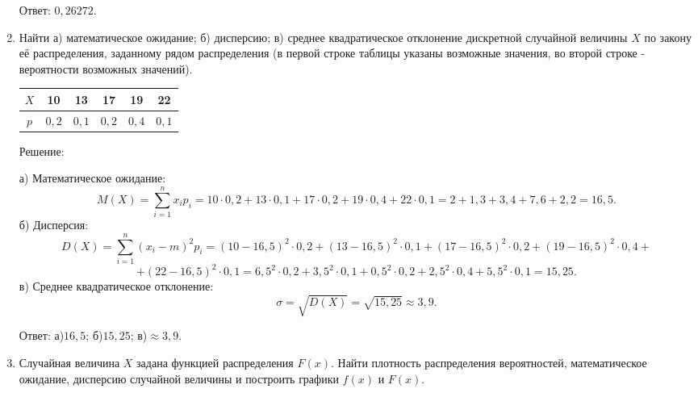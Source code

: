 \documentclass{article}
\begin{document}
\begin{enumerate}
Ответ: $0,26272$.

\item %
Найти а) математическое ожидание; б) дисперсию; в) среднее квадратическое отклонение дискретной случайной величины $X$ по закону её распределения, заданному рядом распределения (в первой строке таблицы указаны возможные значения, во второй строке - вероятности возможных значений).

\begin{center}
\begin{tabular}{|c|c|c|c|c|c|}
\hline
$X$ & 10 & 13 & 17 & 19 & 22 \\
\hline
$p$ & $0,2$ & $0,1$ & $0,2$ & $0,4$ & $0,1$ \\
\hline
\end{tabular}
\end{center}
\begin{center}Решение:\end{center}
а) Математическое ожидание: $$M(X)=\sum_{i=1}^n x_i p_i=10\cdot0,2+13\cdot0,1+17\cdot0,2+19\cdot0,4+22\cdot0,1=2+1,3+3,4+7,6+2,2=16,5.$$
б) Дисперсия:
$$D(X)=\sum_{i=1}^n (x_i-m)^2 p_i=(10-16,5)^2\cdot0,2+(13-16,5)^2\cdot0,1+(17-16,5)^2\cdot0,2+(19-16,5)^2\cdot0,4+$$
$$+(22-16,5)^2\cdot0,1=6,5^2\cdot0,2+3,5^2\cdot0,1+0,5^2\cdot0,2+2,5^2\cdot0,4+5,5^2\cdot0,1=15,25.$$
в) Среднее квадратическое отклонение:
$$\sigma=\sqrt{D(X)}=\sqrt{15,25}\approx3,9.$$

Ответ: а)$16,5$; б)$15,25$; в)$\approx3,9$.

\item %
Случайная величина $X$ задана функцией распределения $F(x)$. Найти плотность распределения вероятностей, математическое ожидание, дисперсию случайной величины и построить графики $f(x)$ и $F(x)$.


\end{enumerate}
\end{document}
